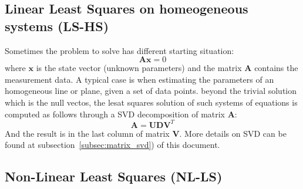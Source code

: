 \subsection{Linear Least Squares on homeogeneous systems (LS-HS)}
\label{subsec:ls_homogeneous}
Sometimes the problem to solve has different starting situation: 
\begin{equation}
 \mathbf{A}\mathbf{x} = 0
\end{equation}
where $\mathbf{x}$ is the state vector (unknown parameters) and the matrix $\mathbf{A}$ contains the measurement data. A typical case is when estimating the parameters of an homogeneous line or plane, given a set of data points. beyond the trivial solution which is the null vectos, the lesat squares solution of such systems of equations is computed as follows through a SVD decomposition of matrix $\mathbf{A}$:
\begin{equation}
 \mathbf{A} = \mathbf{UDV}^T
\end{equation}
And the result is in the last column of matrix $\mathbf{V}$. More details on SVD can be found at subsection~\ref{subsec:matrix_svd}) of this document.










\subsection{Non-Linear Least Squares (NL-LS)}


